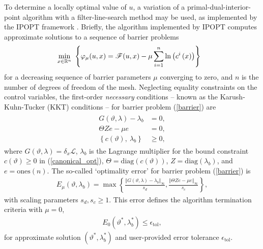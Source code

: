 To determine a locally optimal value of $u$, a variation of a primal-dual-interior-point algorithm with a filter-line-search method may be used, as implemented by the IPOPT framework \citep{waechter_2006}.  Briefly, the algorithm implemented by IPOPT computes approximate solutions to a sequence of barrier problems
\begin{align}
\begin{aligned}
  &\min_{x \in \mathbb{R}^n}\ \left\{ \varphi_{\mu}(u, x) = \mathscr{F}(u,x) - \mu \sum_{i=1}^n \ln \left( c^i\left( x \right) \right) \right\}
\end{aligned}
\label{barrier}
\end{align}
for a decreasing sequence of barrier parameters $\mu$ converging to zero, and $n$ is the number of degrees of freedom of the mesh.  Neglecting equality constraints on the control variables, the first-order  \emph{necessary} conditions -- known as the Karush-Kuhn-Tucker (KKT) conditions --  for barrier problem (\ref{barrier}) are
\begin{align}
\begin{aligned}
  G(\vartheta,\lambda) - \lambda_b &= 0, \\
  \varTheta Z e - \mu e &= 0, \\
  \left\{c(\vartheta),\ \lambda_b \right\} & \geq 0,
\end{aligned}
\label{barrier_kkt}
\end{align}
where $G(\vartheta,\lambda) = \delta_x \mathscr{L}$, $\lambda_b$ is the Lagrange multiplier for the bound constraint $c(\vartheta) \geq 0$ in (\ref{canonical_opt}), $\varTheta = \mathrm{diag}(c(\vartheta))$, $Z = \mathrm{diag}(\lambda_b)$, and $e = \mathrm{ones}(n)$.  The so-called `optimality error' for barrier problem (\ref{barrier}) is
\begin{align*}
  E_{\mu}(\vartheta, \lambda_b) = \max
  \left\{
     \frac{\left\Vert G(\vartheta,\lambda) - \lambda_b \right\Vert_{\infty}}{s_d}, 
     \frac{\left\Vert \varTheta Z e - \mu e \right\Vert_{\infty}}{s_c}
  \right\},
\end{align*}
with scaling parameters $s_d,s_c \geq 1$.  This error defines the algorithm termination criteria with $\mu=0$,
\begin{align}
  \label{term_criteria}
  E_{0}(\vartheta^*, \lambda_b^*) \leq \epsilon_{\mathrm{tol}},
\end{align}
for approximate solution $(\vartheta^*, \lambda_b^*)$ and user-provided error tolerance $\epsilon_{\mathrm{tol}}$.

